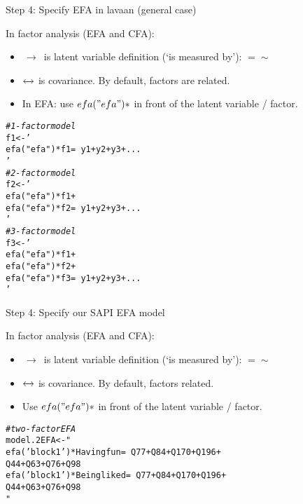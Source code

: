 \documentclass[10pt]{beamer}\usepackage[]{graphicx}\usepackage[]{xcolor}
\makeatletter
\newcommand{\hlsng}[1]{\textcolor[rgb]{0.192,0.494,0.8}{#1}}%
\newcommand{\hlcom}[1]{\textcolor[rgb]{0.678,0.584,0.686}{\textit{#1}}}%
\newcommand{\hldef}[1]{\textcolor[rgb]{0.345,0.345,0.345}{#1}}%
\newcommand{\hlkwb}[1]{\textcolor[rgb]{0.69,0.353,0.396}{#1}}%
\newenvironment{kframe}{%
 \def\at@end@of@kframe{}%
 \ifinner\ifhmode%
  \def\at@end@of@kframe{\end{minipage}}%
  \begin{minipage}{\columnwidth}%
 \fi\fi%
 \def\FrameCommand##1{\hskip\@totalleftmargin \hskip-\fboxsep
 \colorbox{shadecolor}{##1}\hskip-\fboxsep
     \hskip-\linewidth \hskip-\@totalleftmargin \hskip\columnwidth}%
 \MakeFramed {\advance\hsize-\width
   \@totalleftmargin\z@ \linewidth\hsize
   \@setminipage}}%
 {\par\unskip\endMakeFramed%
 \at@end@of@kframe}
\newenvironment{knitrout}{}{} %
\makeatother
\begin{document}
%
\begin{frame}[fragile]{Step 4: Specify EFA in lavaan (general case)}

In factor analysis (EFA and CFA):
\begin{itemize}
  \item $\,\to\,$ is latent variable definition (`is measured by'): $=\sim$ 
  \item $\xleftrightarrow{}$ is covariance. By default, factors are related. %
  \item In EFA: use $efa("efa")*$ in front of the latent variable / factor.
\end{itemize}

\begin{knitrout}
\color{fgcolor}\begin{kframe}
\begin{alltt}
\hlcom{# 1-factor model}
\hldef{f1} \hlkwb{<-} \hlsng{'
efa("efa")*f1 =~ y1 + y2 + y3 + ...
'}
\hlcom{# 2-factor model}
\hldef{f2} \hlkwb{<-} \hlsng{'
efa("efa")*f1 +
efa("efa")*f2 =~ y1 + y2 + y3 + ...
'}
\hlcom{# 3-factor model}
\hldef{f3} \hlkwb{<-} \hlsng{'
efa("efa")*f1 +
efa("efa")*f2 +
efa("efa")*f3 =~ y1 + y2 + y3 + ...
'}
\end{alltt}
\end{kframe}
\end{knitrout}

\end{frame}
%
\begin{frame}[fragile]{Step 4: Specify our SAPI EFA model}

In factor analysis (EFA and CFA):
\begin{itemize}
  \item $\,\to\,$ is latent variable definition (`is measured by'): $=\sim$ 
  \item $\xleftrightarrow{}$ is covariance. By default, factors related. %
  \item Use $efa("efa")*$ in front of the latent variable / factor.
\end{itemize}

\begin{knitrout}
\color{fgcolor}\begin{kframe}
\begin{alltt}
\hlcom{# two-factor EFA}
\hldef{model.2EFA} \hlkwb{<-} \hlsng{"
 efa('block1')*Havingfun  =~ Q77 + Q84 + Q170 + Q196 + 
                              Q44 + Q63 + Q76  + Q98
 efa('block1')*Beingliked =~ Q77 + Q84 + Q170 + Q196 + 
                              Q44 + Q63 + Q76  + Q98
"}
\end{alltt}
\end{kframe}
\end{knitrout}

\end{frame}
\end{document}
